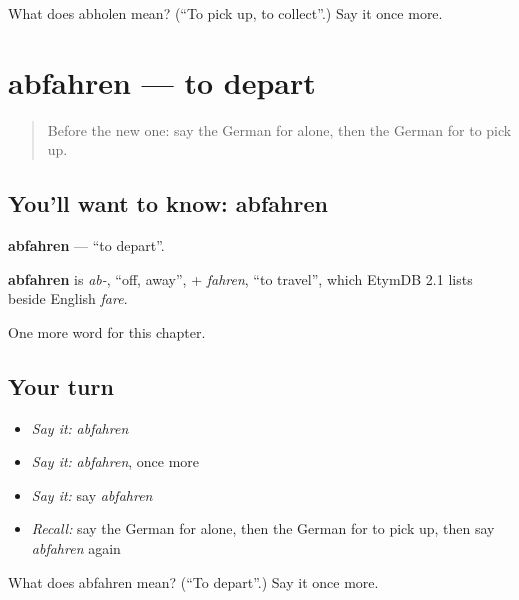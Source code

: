 \begin{tcolorbox}[breakable,colback=teal!4,colframe=teal!35!black,title={Before you move on}]
What does abholen mean? (\textquotedblleft{}To pick up, to collect\textquotedblright{}.) Say it once more.
\end{tcolorbox}
\section[abfahren]{abfahren — to depart}

\label{lesson:GE-C174-abfahren}



\begin{quote}
Before the new one: say the German for alone, then the German for to pick up.
\end{quote}

\subsection*{You'll want to know: abfahren}
\textbf{abfahren} — \textquotedblleft{}to depart\textquotedblright{}.

\begin{cousinweb}
\textbf{abfahren} is \emph{ab-}, \textquotedblleft{}off, away\textquotedblright{}, + \emph{fahren}, \textquotedblleft{}to travel\textquotedblright{}, which EtymDB 2.1 lists beside English \emph{fare}.
\end{cousinweb}

\begin{grammarlens}[title={What you've built}]
One more word for this chapter.
\end{grammarlens}

\subsection*{Your turn}
\begin{itemize}
\raggedright
  \item \emph{Say it:} \emph{abfahren}
  \item \emph{Say it:} \emph{abfahren}, once more
  \item \emph{Say it:} say \emph{abfahren}
  \item \emph{Recall:} say the German for alone, then the German for to pick up, then say \emph{abfahren} again
\end{itemize}

\begin{tcolorbox}[breakable,colback=teal!4,colframe=teal!35!black,title={Before you move on}]
What does abfahren mean? (\textquotedblleft{}To depart\textquotedblright{}.) Say it once more.
\end{tcolorbox}
